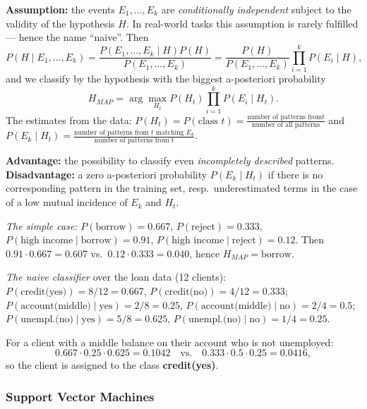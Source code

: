 \documentclass[11pt,a4paper]{article}
\theoremstyle{definition}
\providecommand{\uv}[1]{``#1''}
\begin{document}
\begin{defbox}
\textbf{Assumption:} the events $E_1,\dots,E_k$ are \emph{conditionally independent} subject to
the validity of the hypothesis $H$. In real-world tasks this assumption is rarely fulfilled ---
hence the name \uv{naive}. Then
\[ P(H\mid E_1,\dots,E_k)=\frac{P(E_1,\dots,E_k\mid H)P(H)}{P(E_1,\dots,E_k)}
   =\frac{P(H)}{P(E_1,\dots,E_k)}\prod_{i=1}^{k}P(E_i\mid H), \]
and we classify by the hypothesis with the biggest a-posteriori probability
\[ H_{MAP}=\arg\max_{H_t} P(H_t)\prod_{i=1}^{k}P(E_i\mid H_t). \]
The estimates from the data: $P(H_t)=P(\text{class }t)=\frac{\text{number of patterns from
}t}{\text{number of all patterns}}$ and $P(E_k\mid H_t)=\frac{\text{number of patterns from }t
\text{ matching }E_k}{\text{number of patterns from }t}$.

\textbf{Advantage:} the possibility to classify even \emph{incompletely described} patterns.
\textbf{Disadvantage:} a zero a-posteriori probability $P(E_k\mid H_t)$ if there is no
corresponding pattern in the training set, resp.\ underestimated terms in the case of a low
mutual incidence of $E_k$ and $H_t$.
\end{defbox}

\begin{defbox}
\emph{The simple case:} $P(\text{borrow})=0.667$, $P(\text{reject})=0.333$,
$P(\text{high income}\mid\text{borrow})=0.91$,
$P(\text{high income}\mid\text{reject})=0.12$. Then
$0.91\cdot 0.667=0.607$ vs.\ $0.12\cdot 0.333=0.040$, hence
$H_{MAP}=\text{borrow}$.

\emph{The naive classifier} over the loan data (12 clients):
$P(\text{credit(yes)})=8/12=0.667$, $P(\text{credit(no)})=4/12=0.333$;
$P(\text{account(middle)}\mid\text{yes})=2/8=0.25$,
$P(\text{account(middle)}\mid\text{no})=2/4=0.5$;
$P(\text{unempl.(no)}\mid\text{yes})=5/8=0.625$,
$P(\text{unempl.(no)}\mid\text{no})=1/4=0.25$.

For a client with a middle balance on their account who is not unemployed:
\[ 0.667\cdot 0.25\cdot 0.625=0.1042 \quad\text{vs.}\quad
   0.333\cdot 0.5\cdot 0.25=0.0416, \]
so the client is assigned to the class \textbf{credit(yes)}.
\end{defbox}

\subsubsection{Support Vector Machines}
\end{document}
